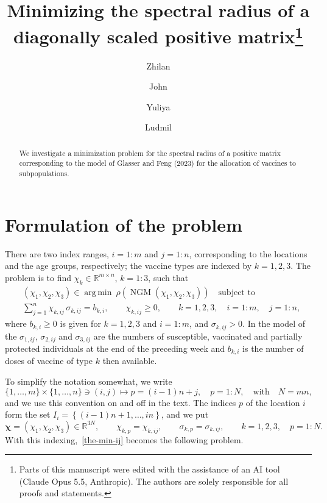 \documentclass[11pt]{article}
\title{Minimizing the spectral radius of a diagonally scaled positive matrix\thanks{Parts of this manuscript were edited with the assistance of an AI tool (Claude Opus 5.5, Anthropic). The authors are solely responsible for all proofs and statements.}}
\author{Zhilan \and John \and Yuliya \and Ludmil}
\date{}
\theoremstyle{plain}
\theoremstyle{definition}
\theoremstyle{remark}
\numberwithin{equation}{section}
\numberwithin{figure}{section}
\numberwithin{table}{section}
\begin{document}
\maketitle

\begin{abstract}
    We investigate a minimization problem for the spectral radius of a positive matrix corresponding to the model of Glasser and Feng (2023) for the allocation of vaccines to subpopulations.
\end{abstract}

\tableofcontents

\section{Formulation of the problem}\label{sec-ngm}


There are two index ranges, $i=1:m$ and $j=1:n$, corresponding to the locations and the age groups, respectively; the vaccine types are indexed by $k=1,2,3$.
The problem is to find $\chi_k\in\mathbb{R}^{m\times n}$, $k=1:3$, such that
\begin{equation}\label{the-min-ij}
\begin{aligned}
&\left(\chi_1,\chi_2,\chi_3\right)
\in\operatorname*{arg\,min}\ \rho\left(\operatorname{NGM}(\chi_1,\chi_2,\chi_3)\right)
\quad\mbox{subject to}\\
&\sum_{j=1}^{n}\chi_{k,ij}\,\sigma_{k,ij}=b_{k,i},\qquad \chi_{k,ij}\ge 0,
\qquad k=1,2,3,\quad i=1:m,\quad j=1:n ,
\end{aligned}
\end{equation}
where $b_{k,i}\ge 0$ is given for $k=1,2,3$ and $i=1:m$, and
$\sigma_{k,ij}>0$.
In the model of~\cite{JZh} the $\sigma_{1,ij}$, $\sigma_{2,ij}$ and $\sigma_{3,ij}$ are
the numbers of susceptible, vaccinated and partially protected individuals at
the end of the preceding week and $b_{k,i}$ is the number of doses of vaccine of
type $k$ then available.

To simplify the notation somewhat, we write
\begin{equation}\label{flat-index}
\{1,\ldots,m\}\times\{1,\ldots,n\}\ni (i,j)\mapsto p=(i-1)n+j,\quad p=1:N, \quad\mbox{with}\quad N=mn,
\end{equation}
and we use this convention on and off in the text. The indices $p$ of the
location $i$ form the set $I_i=\left\{(i-1)n+1,\ldots,in\right\}$, and we put
\begin{equation}\label{flat}
\bm\chi=(\chi_1,\chi_2,\chi_3)\in\mathbb{R}^{3N},\qquad \chi_{k,p}=\chi_{k,ij},\qquad
\sigma_{k,p}=\sigma_{k,ij},\qquad k=1,2,3,\quad p=1:N .
\end{equation}
With this indexing,~\eqref{the-min-ij} becomes the
following problem.
\end{document}

